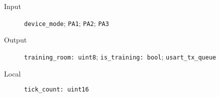 \begin{flushleft}
  \begin{description}
    \item [Input]
      \verb#device_mode#;
      \verb#PA1#;
      \verb#PA2#;
      \verb#PA3#
    \item [Output]
      \verb#training_room: uint8#;
      \verb#is_training: bool#;
      \verb#usart_tx_queue#
    \item [Local]
      \verb#tick_count: uint16#
  \end{description}
\end{flushleft}
